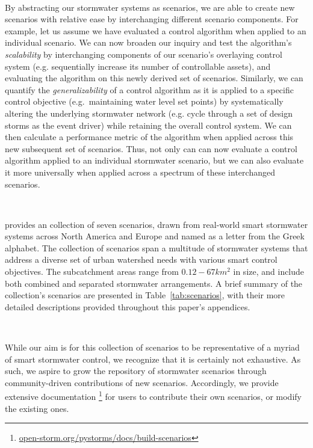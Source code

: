 \

By abstracting our stormwater systems as scenarios, we are able to create new scenarios with relative ease by interchanging different scenario components. For example, let us assume we have evaluated a control algorithm when applied to an individual scenario. We can now broaden our inquiry and test the algorithm's \emph{scalability} by interchanging components of our scenario's overlaying control system (e.g. sequentially increase its number of controllable assets), and evaluating the algorithm on this newly derived set of scenarios. Similarly, we can quantify the \emph{generalizability} of a control algorithm as it is applied to a specific control objective (e.g.\ maintaining water level set points) by systematically altering the underlying stormwater network (e.g. cycle through a set of design storms as the event driver) while retaining the overall control system. We can then calculate a performance metric of the algorithm when applied across this new subsequent set of scenarios. Thus, not only can can now evaluate a control algorithm applied to an individual stormwater scenario, but we can also evaluate it more universally when applied across a spectrum of these interchanged scenarios. 

\

\pystorms provides an collection of seven scenarios, drawn from real-world smart stormwater systems across North America and Europe and named as a letter from the Greek alphabet. The collection of scenarios span a multitude of stormwater systems that address a diverse set of urban watershed needs with various smart control objectives. The subcatchment areas range from $0.12 - 67 \unit{km^2}$ in size, and include both combined and separated stormwater arrangements. A brief summary of the collection's scenarios are presented in Table~\ref{tab:scenarios}, with their more detailed descriptions provided throughout this paper's appendices. 

\

While our aim is for this collection of scenarios to be representative of a myriad of smart stormwater control, we recognize that it is certainly not exhaustive. As such, we aspire to grow the \pystorms repository of stormwater scenarios through community-driven contributions of new scenarios. Accordingly, we provide extensive documentation \footnote{\href{https://klabum.github.io/pystorms/build/html/BuildingScenarios.html}{open-storm.org/pystorms/docs/build-scenarios}} for users to contribute their own scenarios, or modify the existing ones. 

